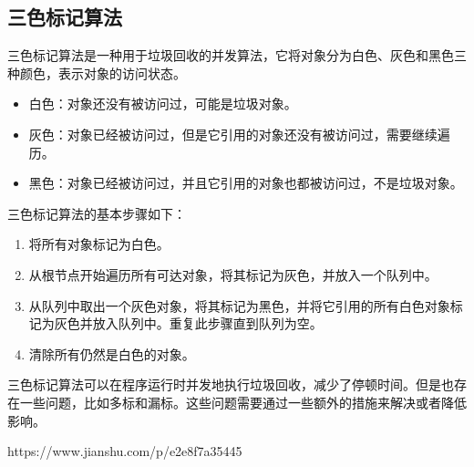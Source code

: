 \documentclass[../../../interview-questions.tex]{subfiles}
\begin{document}
\subsection{三色标记算法}

三色标记算法是一种用于垃圾回收的并发算法，它将对象分为白色、灰色和黑色三种颜色，表示对象的访问状态。

\begin{itemize}
    \item {白色：对象还没有被访问过，可能是垃圾对象。}
    \item {灰色：对象已经被访问过，但是它引用的对象还没有被访问过，需要继续遍历。}
    \item {黑色：对象已经被访问过，并且它引用的对象也都被访问过，不是垃圾对象。}
\end{itemize}

三色标记算法的基本步骤如下：

\begin{enumerate}
    \item {将所有对象标记为白色。}
    \item {从根节点开始遍历所有可达对象，将其标记为灰色，并放入一个队列中。}
    \item {从队列中取出一个灰色对象，将其标记为黑色，并将它引用的所有白色对象标记为灰色并放入队列中。重复此步骤直到队列为空。}
    \item {清除所有仍然是白色的对象。}
\end{enumerate}

三色标记算法可以在程序运行时并发地执行垃圾回收，减少了停顿时间。但是也存在一些问题，比如多标和漏标。这些问题需要通过一些额外的措施来解决或者降低影响。

https://www.jianshu.com/p/e2e8f7a35445
\end{document}
